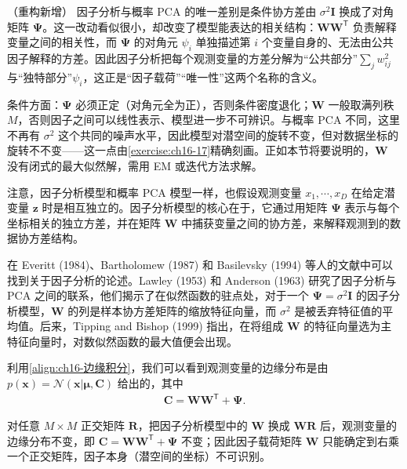 \documentclass[../../main.tex]{subfiles}
\begin{document}
\begin{remark}（重构新增）
因子分析与概率 PCA 的唯一差别是条件协方差由 $\sigma^2\bm{I}$ 换成了对角矩阵 $\bm{\Psi}$。这一改动看似很小，却改变了模型能表达的相关结构：$\bm{W}\bm{W}^{\mathsf T}$ 负责解释变量之间的相关性，而 $\bm{\Psi}$ 的对角元 $\psi_i$ 单独描述第 $i$ 个变量自身的、无法由公共因子解释的方差。因此因子分析把每个观测变量的方差分解为“公共部分”$\sum_{j}w_{ij}^2$ 与“独特部分”$\psi_i$，这正是“因子载荷”“唯一性”这两个名称的含义。

条件方面：$\bm{\Psi}$ 必须正定（对角元全为正），否则条件密度退化；$\bm{W}$ 一般取满列秩 $M$，否则因子之间可以线性表示、模型进一步不可辨识。与概率 PCA 不同，这里不再有 $\sigma^2$ 这个共同的噪声水平，因此模型对潜空间的旋转不变，但对数据坐标的旋转不不变——这一点由\cref{exercise:ch16-17}精确刻画。正如本节将要说明的，$\bm{W}$ 没有闭式的最大似然解，需用 EM 或迭代方法求解。
\end{remark}

注意，因子分析模型和概率 PCA 模型一样，也假设观测变量 $x_1,\cdots,x_D$ 在给定潜变量 $\bm{z}$ 时是相互独立的。因子分析模型的核心在于，它通过用矩阵 $\bm{\Psi}$ 表示与每个坐标相关的独立方差，并在矩阵 $\bm{W}$ 中捕获变量之间的协方差，来解释观测到的数据协方差结构。

在 Everitt (1984)、Bartholomew (1987) 和 Basilevsky (1994) 等人的文献中可以找到关于因子分析的论述。Lawley (1953) 和 Anderson (1963) 研究了因子分析与 PCA 之间的联系，他们揭示了在似然函数的驻点处，对于一个 $\bm{\Psi}=\sigma^2\bm{I}$ 的因子分析模型，$\bm{W}$ 的列是样本协方差矩阵的缩放特征向量，而 $\sigma^2$ 是被丢弃特征值的平均值。后来，Tipping and Bishop (1999) 指出，在将组成 $\bm{W}$ 的特征向量选为主特征向量时，对数似然函数的最大值便会出现。

利用\eqref{align:ch16-边缘积分}，我们可以看到观测变量的边缘分布是由 $p(\bm{x})=\mathcal{N}(\bm{x}|\bm{\mu},\bm{C})$ 给出的，其中
\begin{align}
  \bm{C}=\bm{W}\bm{W}^{\mathsf T}+\bm{\Psi}.
  \label{align:ch16-因子协方差}
\end{align}

\begin{proposition}[因子分析的旋转不变性]\label{proposition:ch16-因子分析旋转不变}
对任意 $M\times M$ 正交矩阵 $\bm{R}$，把因子分析模型中的 $\bm{W}$ 换成 $\bm{W}\bm{R}$ 后，观测变量的边缘分布不变，即 $\bm{C}=\bm{W}\bm{W}^{\mathsf T}+\bm{\Psi}$ 不变；因此因子载荷矩阵 $\bm{W}$ 只能确定到右乘一个正交矩阵，因子本身（潜空间的坐标）不可识别。
\end{proposition}
\end{document}

